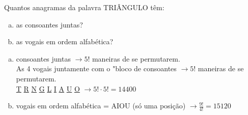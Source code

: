 \begin{ex}
 Quantos anagramas da palavra TRIÂNGULO têm:
    \begin{enumerate}[(a)]
    \item as consoantes juntas?
    \item as vogais em ordem alfabética?
    \end{enumerate}
     \begin{sol}
         \phantom{A} 
      \begin{enumerate} [(a)]
          \item consoantes juntas $\rightarrow 5!$ maneiras de se permutarem.\\
          As 4 vogais juntamente com o "bloco de consoantes $\rightarrow 5!$ maneiras de se permutarem.\\
          \underline{T}
          \underline{R}  \underline{N} \underline{G} \underline{L}
          \underline{I} \underline{A} \underline{U} \underline{O}\hspace{.5cm} $\rightarrow 5! \cdot 5! = 14400 $
        \item vogais em ordem alfabética = AIOU (só uma posição) $\rightarrow \frac{9!}{4!}= 15120$
     \end{enumerate}
     \end{sol}
\end{ex}